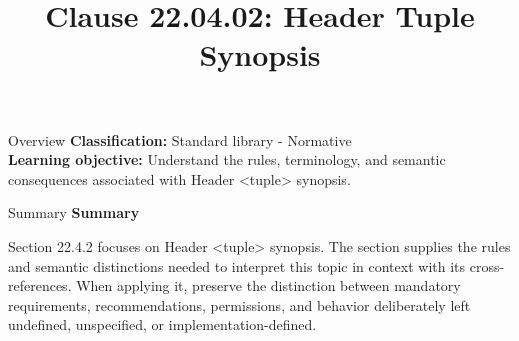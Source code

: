 \documentclass[10pt,letterpaper]{article}
\title{Clause 22.04.02: Header Tuple Synopsis}
\author{}
\date{}
\begin{document}
\maketitle
\begin{CornellOverviewBox}{Overview}
\textbf{Classification:} Standard library - Normative\\[2pt]
\textbf{Learning objective:} Understand the rules, terminology, and semantic consequences associated with Header <tuple> synopsis.
\end{CornellOverviewBox}\begin{CornellSummaryBox}{Summary}
{\sffamily\bfseries\color{Accent} Summary}\par\vspace{3pt}Section 22.4.2 focuses on Header <tuple> synopsis. The section supplies the rules and semantic distinctions needed to interpret this topic in context with its cross-references. When applying it, preserve the distinction between mandatory requirements, recommendations, permissions, and behavior deliberately left undefined, unspecified, or implementation-defined.
\end{CornellSummaryBox}
\end{document}
